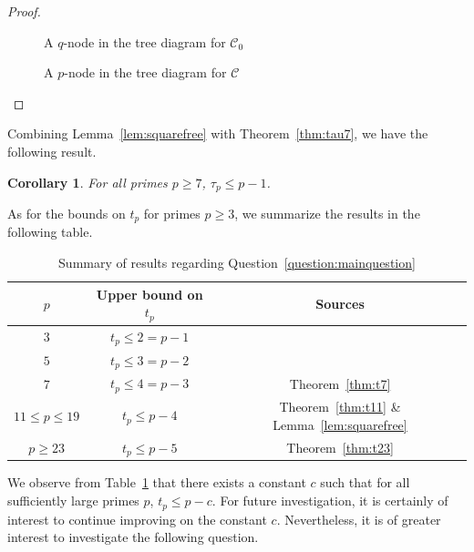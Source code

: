 \documentclass[12pt]{article}
\newtheorem{corollary}[theorem]{Corollary}
\theoremstyle{definition}
\renewcommand{\i}{\textup{\textbf{i}}}
\renewcommand{\j}{\textup{\textbf{j}}}
\begin{document}
\begin{proof}
\begin{figure}[H]
\caption{A $q$-node in the tree diagram for $\mathcal{C}_0$}
\label{fig:otherq-node}
\end{figure}
\begin{figure}[H]
\centering
{}
\caption{A $p$-node in the tree diagram for $\mathcal{C}$}
\label{fig:otherp-node}
\end{figure}
\end{proof}

Combining Lemma~\ref{lem:squarefree} with Theorem~\ref{thm:tau7}, we have the following result.

\begin{corollary}
For all primes $p\geq7$, $\tau_p\leq p-1$.
\end{corollary}

As for the bounds on $t_p$ for primes $p\geq3$, we summarize the results in the following table.

\begin{table}[H]
\centering
\begin{tabular}{|c|c|c|}
\hline
$p$& Upper bound on $t_p$& Sources\\
\hline
$3$& $t_p\leq2=p-1$& \cite{h}\\
$5$& $t_p\leq3=p-2$& \cite{hhm}\\
$7$& $t_p\leq4=p-3$& Theorem~\ref{thm:t7}\\
$11\leq p\leq19$& $t_p\leq p-4$& Theorem~\ref{thm:t11} \& Lemma~\ref{lem:squarefree}\\
$p\geq23$& $t_p\leq p-5$& Theorem~\ref{thm:t23}\\
\hline
\end{tabular}
\caption{Summary of results regarding Question~\ref{question:mainquestion}}
\label{table}
\end{table}

We observe from Table~\ref{table} that there exists a constant $c$ such that for all sufficiently large primes $p$, $t_p\leq p-c$. For future investigation, it is certainly of interest to continue improving on the constant $c$. Nevertheless, it is of greater interest to investigate the following question.
\end{document}
